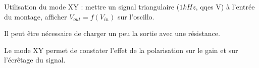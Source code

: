 \documentclass{../template/labo}
\begin{document}
\begin{manip}
{
Utilisation du mode XY :
mettre un signal triangulaire ($1kHz$, qqes V) à l'entrée du montage, afficher $V_{out}=f(V_{in})$ sur l'oscillo.

 Il peut être nécessaire de charger un peu la sortie avec une résistance.

Le mode XY permet de constater l'effet de la polarisation sur le gain et sur l'écrêtage du signal.
}
\end{manip}




\clearpage
\end{document}
